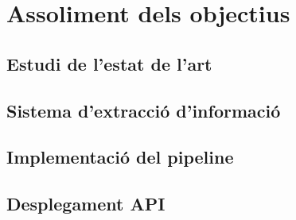 \section{Assoliment dels objectius}

\subsection{Estudi de l'estat de l'art}
\subsection{Sistema d'extracció d'informació}
\subsection{Implementació del pipeline}
\subsection{Desplegament API}


